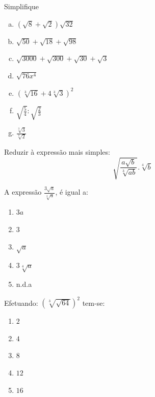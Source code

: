 \begin{exer} Simplifique
\begin{enumerate}[a)]
\item $(\sqrt{8} + \sqrt{2})\sqrt{32}$
\item $\sqrt{50} + \sqrt{18} + \sqrt{98}$
\item $\sqrt{3000} + \sqrt{300}+ \sqrt{30}+ \sqrt{3}$
\item $\sqrt{76x^4}$
\item $(\sqrt[3]{16}+4\sqrt[3]{3})^2$
\item $\sqrt{\frac{5}{4}} \colon \sqrt{\frac{2}{3}}$
\item $\frac{\sqrt[3]{3}}{\sqrt[2]{2}}$
\end{enumerate}
\end{exer}
\begin{exer}[EsPCEx]Reduzir à expressão mais simples: $$ \sqrt{\frac{a\sqrt{b}}{\sqrt[3]{ab}}}.\sqrt[4]{b}$$
\end{exer}
\begin{exer}[EsPCEx]A expressão $\frac{3\sqrt{a}}{\sqrt[4]{a}}$, é igual a:
\begin{enumerate}[A ( )]
\item $3a$
\item $3$
\item $\sqrt{a}$
\item $3 \sqrt[4]{a}$
\item n.d.a
\end{enumerate}
\end{exer}

\begin{exer}[PM] Efetuando: $\left( \sqrt[3]{\sqrt{64}}\right)^2$ tem-se:
\begin{enumerate}[A ( )]
\item $2$
\item $4$
\item $8$
\item $12$
\item $16$
\end{enumerate}
\end{exer}

